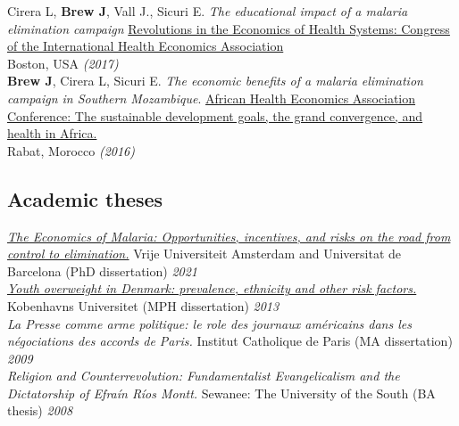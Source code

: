 \documentclass[11pt]{article}
\begin{document}
{{\noindent Cirera L, \textbf{Brew J}, Vall J., Sicuri E. \emph{The educational impact of a malaria elimination campaign} \href{https://www.healtheconomics.org/page/BostonCongress2017}{Revolutions in the Economics of Health Systems: Congress of the International Health Economics Association} \\
Boston, USA \hfill \emph{(2017)}\\


\noindent \textbf{Brew J}, Cirera L, Sicuri E. \emph{The economic benefits of a malaria elimination campaign in Southern Mozambique}. \href{http://afhea.org/en/conferences/conference-2016-rabat}{African Health Economics Association Conference: The sustainable development goals, the grand convergence, and health in Africa.} \\
Rabat, Morocco \hfill \emph{(2016)}\\



\subsection*{Academic theses}

\noindent \emph{\href{https://research.vu.nl/en/publications/the-economics-of-malaria-control-opportunities-incentives-and-ris}{The Economics of Malaria: Opportunities, incentives, and risks on the road from control to elimination.}} Vrije Universiteit Amsterdam and Universitat de Barcelona (PhD dissertation) \hfill \emph{2021}\\

\noindent \emph{\href{http://info.skolesundhed.dk/wp-content/uploads/2012/10/Speciale-af-Joseph-Brew.pdf}{Youth overweight in Denmark: prevalence, ethnicity and other risk factors.}} Kobenhavns Universitet (MPH dissertation) \hfill \emph{2013}\\


\noindent \emph{La Presse comme arme politique: le role des journaux américains dans les négociations des accords de Paris.} Institut Catholique de Paris (MA dissertation) \hfill \emph{2009}\\

\noindent \emph{Religion and Counterrevolution: Fundamentalist Evangelicalism and the Dictatorship of Efraín Ríos Montt.} Sewanee: The University of the South (BA thesis) \hfill \emph{2008}\\

}}
\end{document}
